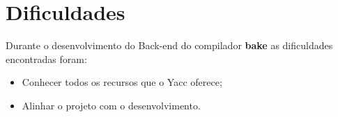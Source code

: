\section{Dificuldades}
Durante o desenvolvimento do Back-end do compilador \textbf{bake} as dificuldades encontradas foram:

\begin{itemize}
\item Conhecer todos os recursos que o Yacc oferece;
\item Alinhar o projeto com o desenvolvimento.
\end{itemize}
